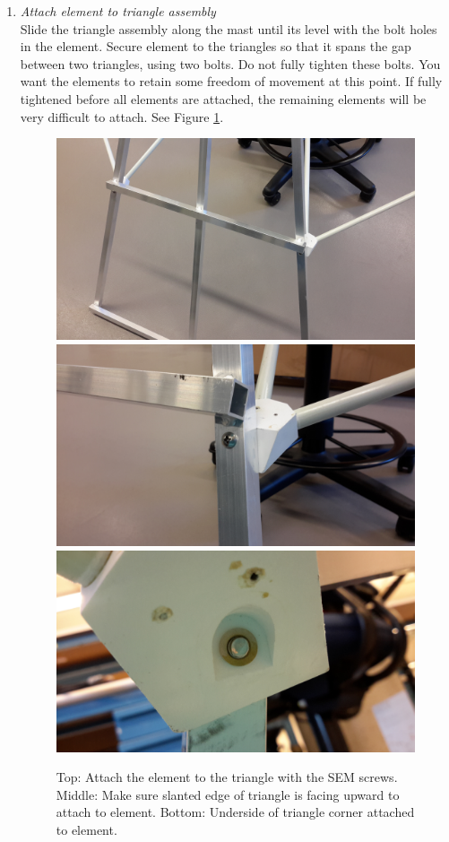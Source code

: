\documentclass[12pt]{article}
\begin{document}
\begin{enumerate}
\begin{enumerate}
			\item \emph{Attach element to triangle assembly} \\ Slide the triangle assembly along the mast until its level with the bolt holes in the element. Secure element to the triangles so that it spans the gap between two triangles, using two bolts. Do not fully tighten these bolts. You want the elements to retain some freedom of movement at this point. If fully tightened before all elements are attached, the remaining elements will be very difficult to attach. See Figure \ref{Tri+Element}.

\begin{figure}[!p]
	\center
	\includegraphics[width=0.7\linewidth]{20141125_102636.jpg}
	\includegraphics[width=0.7\linewidth]{20141125_102607.jpg}
	\includegraphics[width=0.7\linewidth]{20141125_102622.jpg}
	\caption{Top:  Attach the element to the triangle with the SEM screws. Middle: Make sure slanted edge of triangle is facing upward to attach to element. Bottom: Underside of triangle corner attached to element. \label{Tri+Element}}
\end{figure}
	

\end{enumerate}
\end{enumerate}
\end{document}

